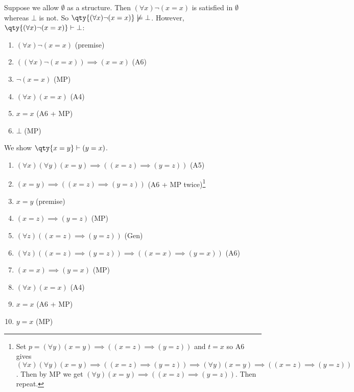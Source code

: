 \begin{remark}
    Suppose we allow $\emptyset$ as a structure.
    Then $(\forall x) \neg (x = x)$ is satisfied in $\emptyset$ whereas $\bot$ is not.
    So $\qty{(\forall x) \neg (x = x)} \not\models \bot$.
    However, $\qty{(\forall x) \neg (x = x)} \vdash \bot$:
    \begin{enumerate}
        \item $(\forall x) \neg (x = x)$ (premise)
        \item $((\forall x) \neg (x = x)) \implies (x=x)$ (A6)
        \item $\neg (x = x)$ (MP)
        \item $(\forall x) (x = x)$ (A4)
        \item $x = x$ (A6 + MP)
        \item $\bot$ (MP)
    \end{enumerate}
\end{remark}

\begin{example}
    We show $\qty{x = y} \vdash (y = x)$.
    \begin{enumerate}
        \item $(\forall x) (\forall y) (x = y) \implies ((x = z) \implies (y = z))$ (A5)
        \item $(x = y) \implies ((x = z) \implies (y = z))$ (A6 + MP twice)\footnote{Set $p = (\forall y) (x = y) \implies ((x = z) \implies (y = z))$ and $t = x$ so A6 gives $(\forall x) (\forall y) (x = y) \implies ((x = z) \implies (y = z)) \implies (\forall y) (x = y) \implies ((x = z) \implies (y = z))$.
        Then by MP we get $(\forall y) (x = y) \implies ((x = z) \implies (y = z))$.
        Then repeat.}
        \item $x = y$ (premise)
        \item $(x = z) \implies (y = z)$ (MP)
        \item $(\forall z) ((x = z) \implies (y = z))$ (Gen)
        \item $(\forall z) ((x = z) \implies (y = z)) \implies ((x = x) \implies (y = x))$ (A6)
        \item $(x = x) \implies (y = x)$ (MP)
        \item $(\forall x) (x = x)$ (A4)
        \item $x = x$ (A6 + MP)
        \item $y = x$ (MP)
    \end{enumerate}
\end{example}

